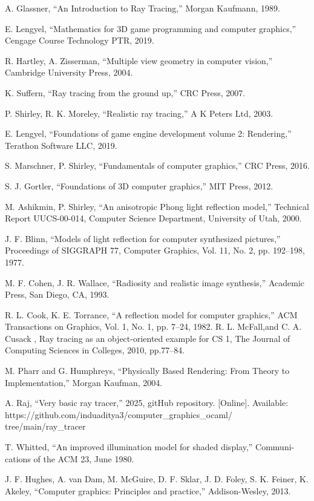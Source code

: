 \documentclass[conference]{IEEEtran}
\begin{document}
\begin{thebibliography}{00}
 A. Glassner, ``An Introduction to Ray Tracing,'' Morgan Kaufmann, 1989.

 E. Lengyel, ``Mathematics for 3D game programming and computer graphics,'' Cengage Course Technology PTR, 2019.

 R. Hartley, A. Zisserman, ``Multiple view geometry in computer vision,'' Cambridge University Press, 2004.

 K. Suffern, ``Ray tracing from the ground up,'' CRC Press, 2007.

 P. Shirley, R. K. Moreley, ``Realistic ray tracing,'' A K Peters Ltd, 2003.

 E. Lengyel, ``Foundations of game engine development volume 2: Rendering,'' Terathon Software LLC, 2019.

 S. Marschner, P. Shirley, ``Fundamentals of computer graphics,'' CRC Press, 2016.

 S. J. Gortler, ``Foundations of 3D computer graphics,'' MIT Press, 2012.

 M. Ashikmin, P. Shirley, ``An anisotropic Phong light reflection model,'' Technical Report UUCS-00-014, Computer Science Department, University of Utah, 2000.

 J. F. Blinn, ``Models of light reflection for computer synthesized pictures,'' Proceedings of SIGGRAPH 77, Computer Graphics, Vol. 11, No. 2, pp. 192–198, 1977.

 M. F. Cohen, J. R. Wallace, ``Radiosity and realistic image synthesis,'' Academic Press, San Diego, CA, 1993.

 R. L. Cook, K. E. Torrance, ``A reflection model for computer graphics,'' ACM Transactions on Graphics, Vol. 1, No. 1, pp. 7–24, 1982.
 R. L. McFall,and C. A. Cusack , Ray tracing as an object-oriented example for CS 1, The Journal of Computing Sciences in Colleges, 2010, pp.77--84.

 M. Pharr and G. Humphreys, ``Physically Based Rendering: From Theory to Implementation,'' Morgan Kaufman, 2004.


 A. Raj, ``Very basic ray tracer,'' 2025, gitHub repository. [Online]. Available: https://github.com/induaditya3/computer\_graphics\_ocaml/\\tree/main/ray\_tracer


 T. Whitted, ``An improved illumination model for shaded display,'' Communi-
cations of the ACM 23, June 1980.

 J. F. Hughes, A. van Dam, M. McGuire, D. F. Sklar, J. D. Foley, S. K. Feiner, K. Akeley, ``Computer graphics: Principles and practice,'' Addison-Wesley, 2013.
\end{thebibliography}
\end{document}
